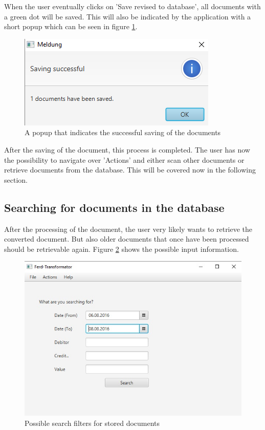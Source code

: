 When the user eventually clicks on 'Save revised to database', all documents with a green dot will be saved. This will also be indicated by the application with a short popup which can be seen in figure \ref{savingSuccessful}.

\begin{figure}[ht!]
\centering
\includegraphics[scale=0.6]{Images/GUI/savingSuccessful.png}
\caption{A popup that indicates the successful saving of the documents \label{savingSuccessful}}
\end{figure}

After the saving of the document, this process is completed. The user has now the possibility to navigate over 'Actions' and either scan other documents or retrieve documents from the database. This will be covered now in the following section.

\subsection{Searching for documents in the database}
\label{sec5.8.2}

After the processing of the document, the user very likely wants to retrieve the converted document. But also older documents that once have been processed should be retrievable again.
Figure \ref{searchInDatabase} shows the possible input information. 

\begin{figure}[ht!]
\centering
\includegraphics[scale=0.6]{Images/GUI/SearchInDatabase.jpg}
\caption{Possible search filters for stored documents \label{searchInDatabase}}
\end{figure}

